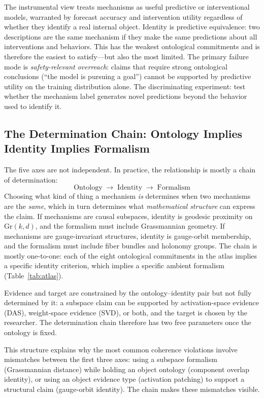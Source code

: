 \documentclass[11pt]{article}
\theoremstyle{remark}
\newcommand{\Gr}{\mathrm{Gr}}
\begin{document}
The instrumental view treats mechanisms as useful predictive or
interventional models, warranted by forecast accuracy and intervention
utility regardless of whether they identify a real internal object.
Identity is predictive equivalence: two descriptions are the same
mechanism if they make the same predictions about all interventions and
behaviors.  This has the weakest ontological commitments and is therefore
the easiest to satisfy---but also the most limited.  The primary failure
mode is \emph{safety-relevant overreach}: claims that require strong
ontological conclusions (``the model is pursuing a goal'') cannot be
supported by predictive utility on the training distribution alone.
The discriminating experiment: test whether the mechanism label generates
novel predictions beyond the behavior used to identify it.

\subsection{The Determination Chain: Ontology Implies Identity Implies Formalism}\label{sec:chain}

The five axes are not independent.  In practice, the relationship is
mostly a chain of determination:
\[
\text{Ontology} \;\longrightarrow\; \text{Identity} \;\longrightarrow\; \text{Formalism}
\]
Choosing what kind of thing a mechanism \emph{is} determines when two
mechanisms are the \emph{same}, which in turn determines what
\emph{mathematical structure} can express the claim.  If mechanisms are
causal subspaces, identity is geodesic proximity on $\Gr(k,d)$, and the
formalism must include Grassmannian geometry.  If mechanisms are
gauge-invariant structures, identity is gauge-orbit membership, and the
formalism must include fiber bundles and holonomy groups.  The chain is
mostly one-to-one: each of the eight ontological commitments in the atlas
implies a specific identity criterion, which implies a specific ambient
formalism (Table~\ref{tab:atlas}).

Evidence and target are constrained by the ontology--identity pair but
not fully determined by it: a subspace claim can be supported by
activation-space evidence (DAS), weight-space evidence (SVD), or both,
and the target is chosen by the researcher.  The determination chain
therefore has two free parameters once the ontology is fixed.

This structure explains why the most common coherence violations involve
mismatches between the first three axes: using a subspace formalism
(Grassmannian distance) while holding an object ontology (component
overlap identity), or using an object evidence type (activation patching)
to support a structural claim (gauge-orbit identity).  The chain makes
these mismatches visible.
\end{document}
